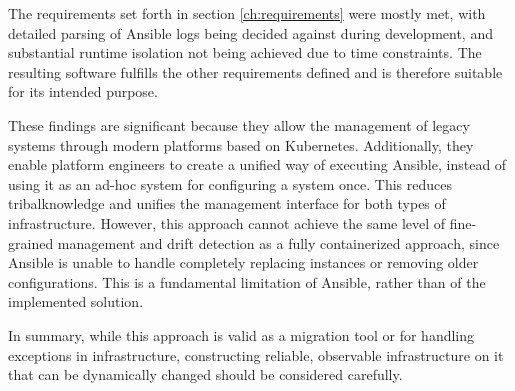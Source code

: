 The requirements set forth in section \ref{ch:requirements} were mostly met, with detailed parsing of Ansible logs being decided against during development, and substantial runtime isolation not being achieved due to time constraints.
The resulting software fulfills the other requirements defined and is therefore suitable for its intended purpose.

These findings are significant because they allow the management of legacy systems through modern platforms based on Kubernetes.
Additionally, they enable platform engineers to create a unified way of executing Ansible, instead of using it as an ad-hoc system for configuring a system once.
This reduces \gls{tribalknowledge} and unifies the management interface for both types of infrastructure.
However, this approach cannot achieve the same level of fine-grained management and drift detection as a fully containerized approach, since Ansible is unable to handle completely replacing instances or removing older configurations.
This is a fundamental limitation of Ansible, rather than of the implemented solution.

In summary, while this approach is valid as a migration tool or for handling exceptions in infrastructure, constructing reliable, observable infrastructure on it that can be dynamically changed should be considered carefully.

